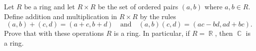 \documentclass{article}
\DeclareMathOperator{\R}{\mathbb{R}}
\DeclareMathOperator{\C}{\mathbb{C}}
\begin{document}
Let \(R\) be a ring and let \(R\times R\) be the set of ordered pairs \((a,b)\) where \(a,b\in R\). Define addition and multiplication in \(R\times R\) by the rules
\[(a,b)+(c,d)=(a+c,b+d)\quad\text{and}\quad(a,b)(c,d)=(ac-bd,ad+bc).\]
Prove that with these operations \(R\) is a ring. In particular, if \(R=\R\), then \(\C\) is a ring.
\end{document}

